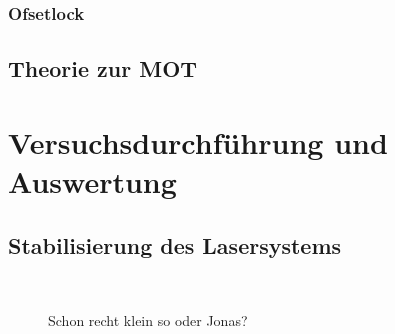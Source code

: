 \documentclass[twoside,colorback,accentcolor=tud4c,11pt]{tudreport}
\begin{document}
\subsection{Ofsetlock}
\section{Theorie zur MOT}\label{theorie} 	
\chapter{Versuchsdurchführung und Auswertung}
\section{Stabilisierung des Lasersystems}
\begin{figure}[H]
  \centering
   \qquad
   \\
   \qquad
  \caption{Schon recht klein so oder Jonas?}
\end{figure}
\end{document}

